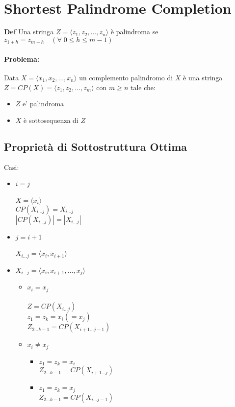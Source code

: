 \section{Shortest Palindrome Completion}
\begin{mdframed}
    \textbf{Def} \quad Una stringa $Z = \langle z_1,z_2,\ldots,z_n \rangle$ è palindroma se $z_{1+h} = z_{m-h} \quad (\forall\; 0 \leq h \leq m-1)$
\end{mdframed}
\paragraph{Problema:} Data $X = \langle x_1,x_2,\ldots,x_n \rangle$ un complemento palindromo di $X$ è una stringa $Z = CP(X) = \langle z_1,z_2,\ldots,z_m \rangle$ con $m \geq n$ tale che:
\begin{itemize}
    \item $Z$ e' palindroma
    \item $X$ è sottosequenza di $Z$
\end{itemize}
\subsection{Proprietà di Sottostruttura Ottima}
Casi:
\begin{itemize}
    \item $i=j$ \\~\\
          $X = \langle x_i \rangle$ \\
          $CP(X_{i \ldots j}) = X_{i \ldots j}$ \\
          $|CP(X_{i \ldots j})| = |X_{i \ldots j}|$
    \item $j = i+1$ \\~\\
          $X_{i \ldots j} = \langle x_i,x_{i+1} \rangle$
    \item $X_{i \ldots j} = \langle x_i,x_{i+1},\ldots,x_j \rangle$
    \begin{itemize}
        \item $x_i = x_j$ \\~\\
              $Z = CP(X_{i \ldots j})$ \\
              $z_1 = z_k = x_i (= x_j)$ \\
              $Z_{2 \ldots k-1} = CP(X_{i+1 \ldots j-1})$
        \item $x_i \not= x_j$
        \begin{itemize}
            \item $z_1 = z_k = x_i$ \\
                  $Z_{2 \ldots k-1} = CP(X_{i+1 \ldots j})$
            \item $z_1 = z_k = x_j$ \\
                  $Z_{2 \ldots k-1} = CP(X_{i \ldots j-1})$
        \end{itemize}
    \end{itemize}
\end{itemize}

